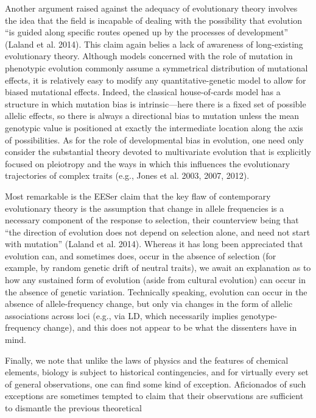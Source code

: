\documentclass{article}
\begin{document}
Another argument raised against the adequacy of evolutionary theory involves the idea that the field is incapable of dealing with the possibility that evolution “is guided along specific routes opened up by the processes of development” (Laland et al. 2014). This claim again belies a lack of awareness of long-existing evolutionary theory. Although models concerned with the role of mutation in phenotypic evolution commonly assume a symmetrical distribution of mutational effects, it is relatively easy to modify any quantitative-genetic model to allow for biased mutational effects. Indeed, the classical house-of-cards model has a structure in which mutation bias is intrinsic—here there is a fixed set of possible allelic effects, so there is always a directional bias to mutation unless the mean genotypic value is positioned at exactly the intermediate location along the axis of possibilities. As for the role of developmental bias in evolution, one need only consider the substantial theory devoted to multivariate evolution that is explicitly focused on pleiotropy and the ways in which this influences the evolutionary trajectories of complex traits (e.g., Jones et al. 2003, 2007, 2012).

Most remarkable is the EESer claim that the key flaw of contemporary evolutionary theory is the assumption that change in allele frequencies is a necessary component of the response to selection, their counterview being that “the direction of evolution does not depend on selection alone, and need not start with mutation” (Laland et al. 2014). Whereas it has long been appreciated that evolution can, and sometimes does, occur in the absence of selection (for example, by random genetic drift of neutral traits), we await an explanation as to how any sustained form of evolution (aside from cultural evolution) can occur in the absence of genetic variation. Technically speaking, evolution can occur in the absence of allele-frequency change, but only via changes in the form of allelic associations across loci (e.g., via LD, which necessarily implies genotype-frequency change), and this does not appear to be what the dissenters have in mind.

Finally, we note that unlike the laws of physics and the features of chemical elements, biology is subject to historical contingencies, and for virtually every set of general observations, one can find some kind of exception. Aficionados of such exceptions are sometimes tempted to claim that their observations are sufficient to dismantle the previous theoretical
\end{document}
